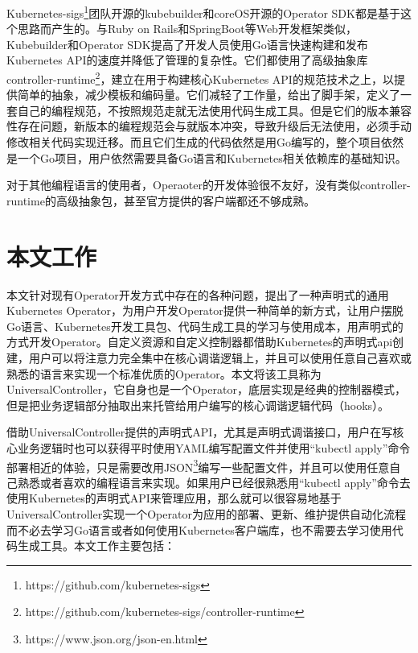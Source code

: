 \documentclass[macfonts,master]{njuthesis}
\begin{document}
Kubernetes-sigs\footnote{https://github.com/kubernetes-sigs}团队开源的kubebuilder和coreOS开源的Operator SDK都是基于这个思路而产生的。与Ruby on Rails和SpringBoot等Web开发框架类似，Kubebuilder和Operator SDK提高了开发人员使用Go语言快速构建和发布Kubernetes API的速度并降低了管理的复杂性。它们都使用了高级抽象库controller-runtime\footnote{https://github.com/kubernetes-sigs/controller-runtime}，建立在用于构建核心Kubernetes API的规范技术之上，以提供简单的抽象，减少模板和编码量。它们减轻了工作量，给出了脚手架，定义了一套自己的编程规范，不按照规范走就无法使用代码生成工具。但是它们的版本兼容性存在问题，新版本的编程规范会与就版本冲突，导致升级后无法使用，必须手动修改相关代码实现迁移。而且它们生成的代码依然是用Go编写的，整个项目依然是一个Go项目，用户依然需要具备Go语言和Kubernetes相关依赖库的基础知识\cite{problemofoperators}。

对于其他编程语言的使用者，Operaoter的开发体验很不友好，没有类似controller-runtime的高级抽象包，甚至官方提供的客户端都还不够成熟。

\section{本文工作}
本文针对现有Operator开发方式中存在的各种问题，提出了一种声明式的通用Kubernetes Operator，为用户开发Operator提供一种简单的新方式，让用户摆脱Go语言、Kubernetes开发工具包、代码生成工具的学习与使用成本，用声明式的方式开发Operator。自定义资源和自定义控制器都借助Kubernetes的声明式api创建，用户可以将注意力完全集中在核心调谐逻辑上，并且可以使用任意自己喜欢或熟悉的语言来实现一个标准优质的Operator。本文将该工具称为UniversalController，它自身也是一个Operator，底层实现是经典的控制器模式，但是把业务逻辑部分抽取出来托管给用户编写的核心调谐逻辑代码（hooks）。

借助UniversalController提供的声明式API，尤其是声明式调谐接口，用户在写核心业务逻辑时也可以获得平时使用YAML编写配置文件并使用``kubectl apply''命令部署相近的体验，只是需要改用JSON\footnote{https://www.json.org/json-en.html}编写一些配置文件，并且可以使用任意自己熟悉或者喜欢的编程语言来实现。如果用户已经很熟悉用``kubectl apply''命令去使用Kubernetes的声明式API来管理应用，那么就可以很容易地基于UniversalController实现一个Operator为应用的部署、更新、维护提供自动化流程而不必去学习Go语言或者如何使用Kubernetes客户端库，也不需要去学习使用代码生成工具。本文工作主要包括：
\end{document}
